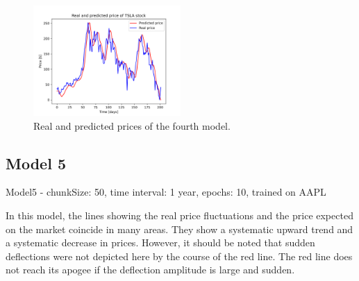 \begin{figure}
\includegraphics[width=0.5\textwidth]{./graf/model4/TSLA.png}
\caption{Real and predicted prices of the fourth model.}
\label{fig:label}
\end{figure} 

\clearpage
\subsection{Model 5}

Model5 - chunkSize: 50, time interval: 1 year, epochs: 10, trained on AAPL\par\bigskip
In this model, the lines showing the real price fluctuations and the price expected on the
market coincide in many areas. They show a systematic upward trend and a systematic decrease in
prices. However, it should be noted that sudden deflections were not depicted here by the course of
the red line. The red line does not reach its apogee if the deflection amplitude is large and sudden.

